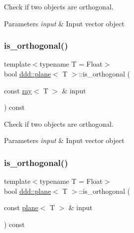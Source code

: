 Check if two objects are orthogonal. 


\begin{DoxyParams}{Parameters}
{\em input} & Input vector object \\
\hline
\end{DoxyParams}
\mbox{\label{classddd_1_1plane_ab2e96b3fc7db8468a01f487f0a03fbf5}} 
\subsubsection{\texorpdfstring{is\+\_\+orthogonal()}{is\_orthogonal()}\hspace{0.1cm}{\footnotesize\ttfamily [3/5]}}
{\footnotesize\ttfamily template$<$typename T = Float$>$ \\
bool \hyperlink{classddd_1_1plane}{ddd\+::plane}$<$ T $>$\+::is\+\_\+orthogonal (\begin{DoxyParamCaption}\item[{const \hyperlink{classddd_1_1ray}{ray}$<$ T $>$ \&}]{input }\end{DoxyParamCaption}) const\hspace{0.3cm}{\ttfamily [inline]}}



Check if two objects are orthogonal. 


\begin{DoxyParams}{Parameters}
{\em input} & Input vector object \\
\hline
\end{DoxyParams}
\mbox{\label{classddd_1_1plane_a385d3ae184ada014ea95e8139a0995d0}} 
\subsubsection{\texorpdfstring{is\+\_\+orthogonal()}{is\_orthogonal()}\hspace{0.1cm}{\footnotesize\ttfamily [4/5]}}
{\footnotesize\ttfamily template$<$typename T = Float$>$ \\
bool \hyperlink{classddd_1_1plane}{ddd\+::plane}$<$ T $>$\+::is\+\_\+orthogonal (\begin{DoxyParamCaption}\item[{const \hyperlink{classddd_1_1plane}{plane}$<$ T $>$ \&}]{input }\end{DoxyParamCaption}) const\hspace{0.3cm}{\ttfamily [inline]}}



